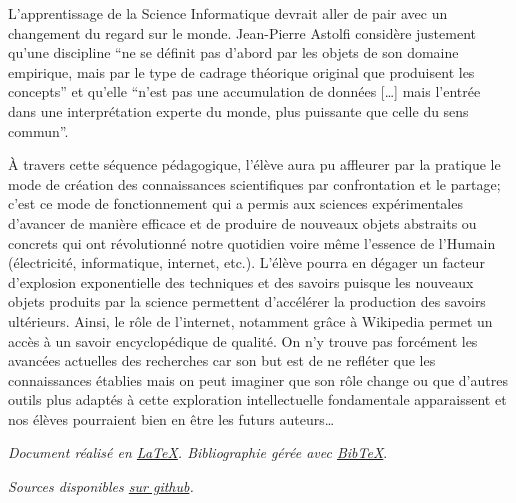 \documentclass[11pt,bibliography=totoc]{scrartcl}
\begin{document}
L'apprentissage de la Science Informatique devrait aller de pair avec un
changement du regard sur le monde. Jean-Pierre Astolfi \cite{astolfi} considère
justement qu'une discipline ``ne se définit pas d'abord par les objets de son
domaine empirique, mais par le type de cadrage théorique original que produisent
les concepts'' et qu'elle ``n'est pas une accumulation de données [\ldots] mais
l'entrée dans une interprétation experte du monde, plus puissante que celle du
sens commun''.

À travers cette séquence pédagogique, l'élève aura pu affleurer par la pratique
le mode de création des connaissances scientifiques par confrontation et
le partage; c'est ce mode de fonctionnement qui a permis aux sciences
expérimentales d'avancer de manière efficace et de produire de nouveaux objets
abstraits ou concrets qui ont révolutionné notre quotidien voire même l'essence
de l'Humain (électricité, informatique, internet, etc.). L'élève pourra en
dégager un facteur d'explosion exponentielle des techniques et des savoirs
puisque les nouveaux objets produits par la science permettent d'accélérer la
production des savoirs ultérieurs. Ainsi, le rôle de l'internet, notamment grâce
à Wikipedia permet un accès à un savoir encyclopédique de qualité. On n'y trouve
pas forcément les avancées actuelles des recherches car son but est de ne
refléter que les connaissances établies mais on peut imaginer que son rôle
change ou que d'autres outils plus adaptés à cette exploration intellectuelle
fondamentale apparaissent et nos élèves pourraient bien en être les futurs
auteurs\ldots

\printbibliography  %
\vfill
\emph{Document réalisé en \href{https://www.latex-project.org/}{\LaTeX}.
  Bibliographie gérée avec \href{http://www.bibtex.org/}{Bib\TeX}}.\par
\emph{Sources disponibles \href{https://github.com/Dalker/didac_010}{sur github}.}

\end{document}
